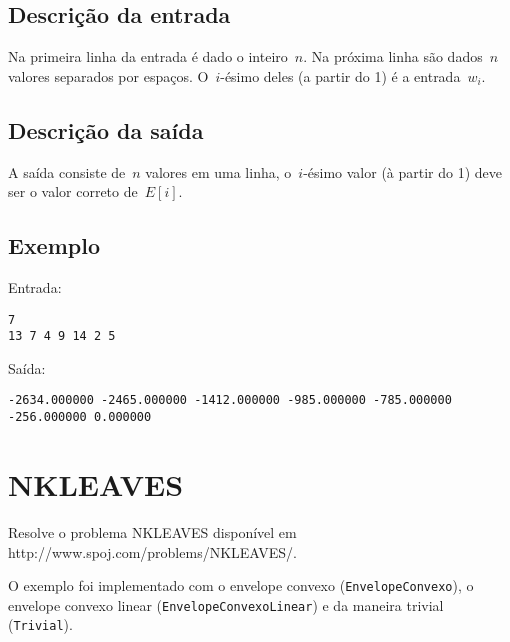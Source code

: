 \subsection{Descrição da entrada}
Na primeira linha da entrada é dado o inteiro~$n$. Na próxima linha são dados~$n$ valores separados por espaços. O~$i$-ésimo deles (a partir do 1) é a entrada~$w_i$.

\subsection{Descrição da saída}
A saída consiste de~$n$ valores em uma linha, o~$i$-ésimo valor (à partir do 1) deve ser o valor correto de~$E[i]$.

\subsection{Exemplo}
Entrada:
\begin{verbatim}
7
13 7 4 9 14 2 5
\end{verbatim}
Saída:
\begin{verbatim}
-2634.000000 -2465.000000 -1412.000000 -985.000000 -785.000000 -256.000000 0.000000
\end{verbatim}


\section{NKLEAVES} \label{NKLEAVES}

Resolve o problema NKLEAVES disponível em http://www.spoj.com/problems/NKLEAVES/.

O exemplo foi implementado com o envelope convexo (\texttt{EnvelopeConvexo}), o envelope convexo linear (\texttt{EnvelopeConvexoLinear}) e da maneira trivial (\texttt{Trivial}).
